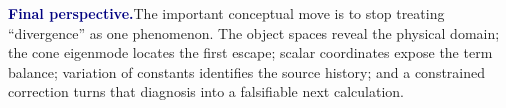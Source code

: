 \documentclass[10pt]{article}
\newcommand{\pedbox}[2]{%
  \par\medskip
  \noindent\colorbox{pale}{%
    \parbox{\dimexpr\linewidth-2\fboxsep\relax}{%
      \textcolor{navy}{\textbf{#1}}\quad #2%
    }%
  }\par\medskip
}
\begin{document}
\pedbox{Final perspective.}{The important conceptual move is to stop treating
``divergence'' as one phenomenon.  The object spaces reveal the physical
domain; the cone eigenmode locates the first escape; scalar coordinates expose
the term balance; variation of constants identifies the source history; and a
constrained correction turns that diagnosis into a falsifiable next
calculation.}
\end{document}
